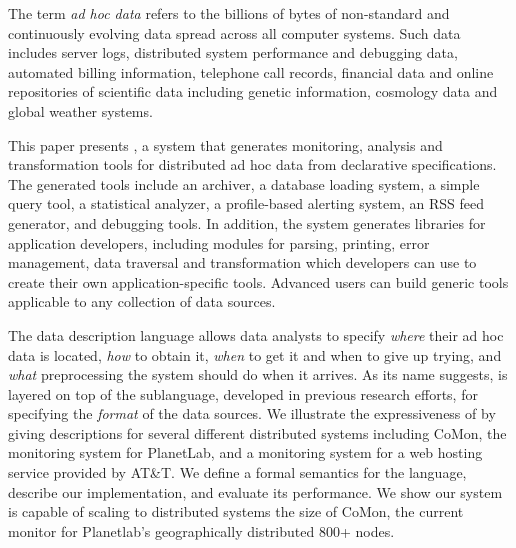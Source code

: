 The term {\em ad hoc data} refers to the billions of bytes of
non-standard and continuously evolving data spread across all computer
systems.  Such data includes server logs, distributed system
performance and debugging data, automated billing information,
telephone call records, financial data and online repositories of
scientific data including genetic information, cosmology data and
global weather systems.

This paper presents \padsd{}, a system that generates monitoring,
analysis and transformation tools for distributed ad hoc data from
declarative specifications.  The generated tools include an archiver,
a database loading system, a simple query tool, a statistical
analyzer, a profile-based alerting system, an RSS feed generator, and
debugging tools.  In addition, the system generates libraries for
application developers, including modules for parsing, printing, error
management, data traversal and transformation which developers can use
to create their own application-specific tools.  Advanced users can
build generic tools applicable to any collection of data sources.

The \padsd{} data description language allows data analysts to specify
{\em where} their ad hoc data is located, {\em how} to obtain it, {\em
when} to get it and when to give up trying, and {\em what}
preprocessing the system should do when it arrives.  As its name
suggests, \padsd{} is layered on top of the \pads{} sublanguage,
developed in previous research efforts, for specifying the {\em
format} of the data sources.  We illustrate the expressiveness of
\padsd{} by giving descriptions for several different distributed
systems including CoMon, the monitoring system for PlanetLab, and a
monitoring system for a web hosting service provided by AT\&T.  We
define a formal semantics for the language, describe our
implementation, and evaluate its performance.  We show our system is
capable of scaling to distributed systems the size of CoMon,
the current monitor for Planetlab's geographically distributed 800+
nodes.




